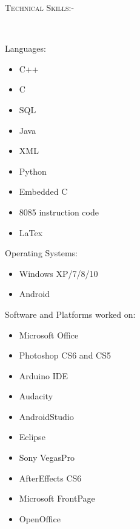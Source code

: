 \documentclass[11pt]{article}
\begin{document}
\begin{figure}[ht]
\begin{minipage}[b]{0.45\linewidth}
\flushleft

\noindent\colorbox{WeakOrange}
{\parbox{\dimexpr\textwidth-2\fboxsep\relax}{\textsc{Technical Skills:-}}}\\
\begin{small}
\begin{enumerate}
\noindent\colorbox{FaintOrange}
{\parbox{\dimexpr\textwidth-2\fboxsep\relax}
{\item  	Languages:}}

\begin{itemize}
\item C++
\item C
\item SQL
\item Java
\item XML
\item Python
\item Embedded C
\item 8085 instruction code
\item LaTex
\end{itemize}
\noindent\colorbox{FaintOrange}
{\parbox{\dimexpr\textwidth-2\fboxsep\relax}
{
\item  Operating Systems:
}}
\begin{itemize}
\item Windows XP/7/8/10
\item Android
\end{itemize}
\noindent\colorbox{FaintOrange}
{\parbox{\dimexpr\textwidth-2\fboxsep\relax}
{
\item  Software and Platforms worked on:
}}
\begin{itemize}
\item Microsoft Office
\item Photoshop CS6 and CS5
\item Arduino IDE
\item Audacity
\item AndroidStudio
\item Eclipse
\item Sony VegasPro
\item AfterEffects CS6
\item  Microsoft FrontPage
\item OpenOffice


\end{itemize}
\end{enumerate}
\end{small}
\end{minipage}
\end{figure}
\end{document}
